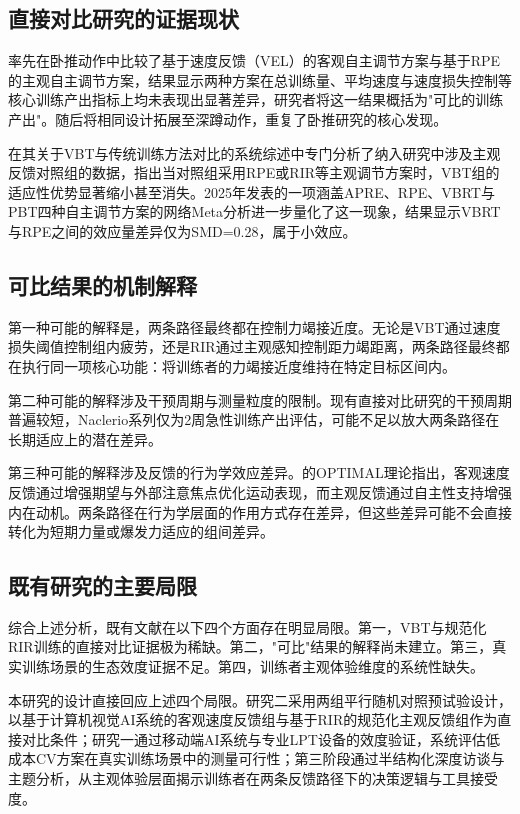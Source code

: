 \subsection{直接对比研究的证据现状}

\citep{Naclerio2025}率先在卧推动作中比较了基于速度反馈（VEL）的客观自主调节方案与基于RPE的主观自主调节方案，结果显示两种方案在总训练量、平均速度与速度损失控制等核心训练产出指标上均未表现出显著差异，研究者将这一结果概括为"可比的训练产出"。\citep{Naclerio2026}随后将相同设计拓展至深蹲动作，重复了卧推研究的核心发现。

\citep{Orange2022}在其关于VBT与传统训练方法对比的系统综述中专门分析了纳入研究中涉及主观反馈对照组的数据，指出当对照组采用RPE或RIR等主观调节方案时，VBT组的适应性优势显著缩小甚至消失。2025年发表的一项涵盖APRE、RPE、VBRT与PBT四种自主调节方案的网络Meta分析进一步量化了这一现象，结果显示VBRT与RPE之间的效应量差异仅为SMD=0.28，属于小效应。

\subsection{可比结果的机制解释}

第一种可能的解释是，两条路径最终都在控制力竭接近度。无论是VBT通过速度损失阈值控制组内疲劳，还是RIR通过主观感知控制距力竭距离，两条路径最终都在执行同一项核心功能：将训练者的力竭接近度维持在特定目标区间内。

第二种可能的解释涉及干预周期与测量粒度的限制。现有直接对比研究的干预周期普遍较短，Naclerio系列仅为2周急性训练产出评估，可能不足以放大两条路径在长期适应上的潜在差异。

第三种可能的解释涉及反馈的行为学效应差异。\citep{Wulf2016}的OPTIMAL理论指出，客观速度反馈通过增强期望与外部注意焦点优化运动表现，而主观反馈通过自主性支持增强内在动机。两条路径在行为学层面的作用方式存在差异，但这些差异可能不会直接转化为短期力量或爆发力适应的组间差异。

\subsection{既有研究的主要局限}

综合上述分析，既有文献在以下四个方面存在明显局限。第一，VBT与规范化RIR训练的直接对比证据极为稀缺。第二，"可比"结果的解释尚未建立。第三，真实训练场景的生态效度证据不足。第四，训练者主观体验维度的系统性缺失。

本研究的设计直接回应上述四个局限。研究二采用两组平行随机对照预试验设计，以基于计算机视觉AI系统的客观速度反馈组与基于RIR的规范化主观反馈组作为直接对比条件；研究一通过移动端AI系统与专业LPT设备的效度验证，系统评估低成本CV方案在真实训练场景中的测量可行性；第三阶段通过半结构化深度访谈与主题分析，从主观体验层面揭示训练者在两条反馈路径下的决策逻辑与工具接受度。
